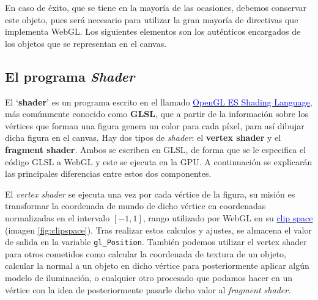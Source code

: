 En caso de éxito, que se tiene en la mayoría de las ocasiones, debemos conservar este objeto, pues será necesario para utilizar la gran mayoría de directivas que implementa WebGL. Los siguientes elementos son los auténticos encargados de los objetos que se representan en el canvas.

\subsection{El programa \textit{Shader}}

El `\textbf{shader}' es un programa escrito en el llamado \href{https://www.khronos.org/registry/OpenGL/specs/es/3.2/GLSL_ES_Specification_3.20.pdf}{\textcolor{blue}{OpenGL ES Shading Language}}, más comúnmente conocido como \textbf{GLSL}, que a partir de la información sobre los vértices que forman una figura genera un color para cada píxel, para así dibujar dicha figura en el canvas. Hay dos tipos de \textit{shader}: el \textbf{vertex shader} y el \textbf{fragment shader}. Ambos se escriben en GLSL, de forma que se le especifica el código GLSL a WebGL y este se ejecuta en la GPU. A continuación se explicarán las principales diferencias entre estos dos componentes.

El \textit{vertex shader} se ejecuta una vez por cada vértice de la figura, su misión es transformar la coordenada de mundo de dicho vértice en coordenadas normalizadas en el intervalo $[-1,1]$, rango utilizado por WebGL en su \href{https://developer.mozilla.org/en-US/docs/Web/API/WebGL_API/WebGL_model_view_projection#clip_space}{\textcolor{blue}{clip space}} (imagen \ref{fig:clipspace}). Tras realizar estos calculos y ajustes, se almacena el valor de salida en la variable \verb|gl_Position|. También podemos utilizar el vertex shader para otros cometidos como calcular la coordenada de textura de un objeto, calcular la normal a un objeto en dicho vértice para posteriormente aplicar algún modelo de iluminación, o cualquier otro procesado que podamos hacer en un vértice con la idea de posteriormente pasarle dicho valor al \textit{fragment shader}.


